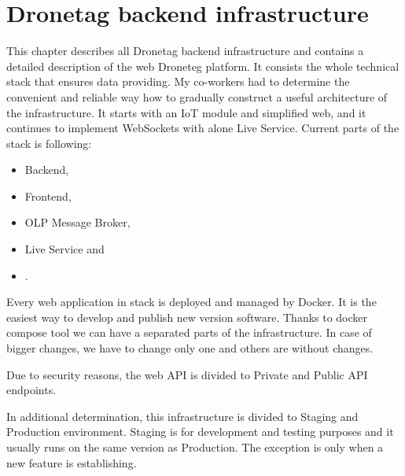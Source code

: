 \chapter{Dronetag backend infrastructure}\label{ch:dronetag-backend-infrastructure}
This chapter describes all Dronetag backend infrastructure and contains a detailed description of the web Droneteg platform.
It consists the whole technical stack that ensures data providing.
My co-workers had to determine the convenient and reliable way how to gradually construct a useful architecture of the infrastructure.
It starts with an IoT module and simplified web, and it continues to implement WebSockets with alone Live Service.
Current parts of the stack is following:
\begin{itemize}
    \item Backend,
    \item Frontend,
    \item OLP Message Broker,
    \item Live Service and
    \item .
\end{itemize}
Every web application in stack is deployed and managed by Docker. %
It is the easiest way to develop and publish new version software.
Thanks to docker compose tool we can have a separated parts of the infrastructure.
In case of bigger changes, we have to change only one and others are without changes.

Due to security reasons, the web API is divided to Private and Public API endpoints.

In additional determination, this infrastructure is divided to Staging and Production environment.
Staging is for development and testing purposes and it usually runs on the same version as Production.
The exception is only when a new feature is establishing.






